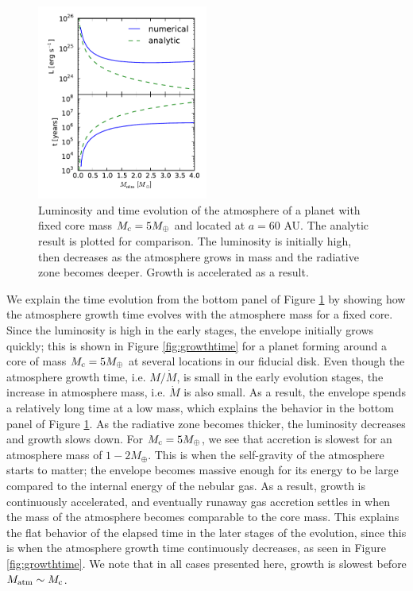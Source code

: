 \documentclass[apj]{emulateapj}
\begin{document}
\begin{figure}[h]
\centering
\includegraphics[width=0.5\textwidth]{../../figs/ModelAtmospheres/RadSelfGravPoly/PaperFigs/Lt_profiles_v2.pdf}
\caption{Luminosity and time evolution of the atmosphere of a planet with fixed core mass $M_{\rm c}=5 M_{\oplus}$ and located at $a=60$ AU. The analytic result is plotted for comparison. The luminosity is initially high, then decreases as the atmosphere grows in mass and the radiative zone becomes deeper. Growth is accelerated as a result.}
\label{fig:Ltplot}
\end{figure}

 
We explain the time evolution from the bottom panel of Figure \ref{fig:Ltplot} by showing how the atmosphere growth time evolves with the atmosphere mass for a fixed core. Since the luminosity is high in the early stages, the envelope initially grows quickly; this is shown in Figure \ref{fig:growthtime} for a planet forming around a core of mass $M_{\rm c}=5 M_{\oplus}$ at several locations in our fiducial disk. Even though the atmosphere growth time, i.e. $M/\dot{M}$, is small in the early evolution stages, the increase in atmosphere mass, i.e. $\dot{M}$ is also small. As a result, the envelope spends a relatively long time at a low mass, which explains the behavior in the bottom panel of Figure \ref{fig:Ltplot}. As the radiative zone becomes thicker, the luminosity decreases and growth slows down. For $M_{\rm c}=5 M_{\oplus}$, we see that accretion is slowest for an atmosphere mass of $1-2 M_{\oplus}$. This is when the self-gravity of the atmosphere starts to matter; the envelope becomes massive enough for its energy to be large compared to the internal energy of the nebular gas. As a result, growth is continuously accelerated, and eventually runaway gas accretion settles in when the mass of the atmosphere becomes comparable to the core mass. This explains the flat behavior of the elapsed time in the later stages of the evolution, since this is when the atmosphere growth time continuously decreases, as seen in Figure \ref{fig:growthtime}. We note that in all cases presented here, growth is slowest before $M_{\rm{atm}} \sim M_{\rm c}$.  %
 
\end{document}
